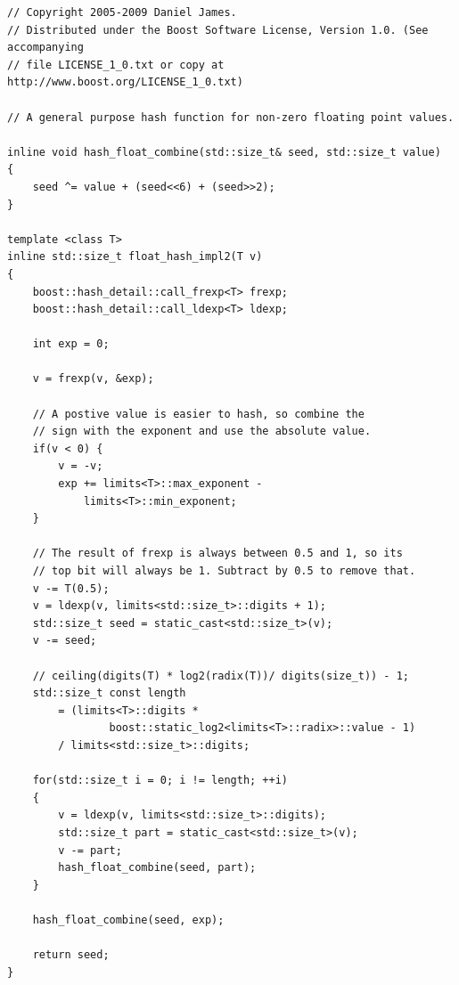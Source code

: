\begin{lstlisting}[label=lst:hash-float-function, caption=Code to Hash Single 32-bit Floating Point Value (Source code from file \texttt{boost/functional/hash/detail/hash\_float\_generic.hpp} in Boost Library 1.42.0)]
// Copyright 2005-2009 Daniel James.
// Distributed under the Boost Software License, Version 1.0. (See accompanying
// file LICENSE_1_0.txt or copy at http://www.boost.org/LICENSE_1_0.txt)

// A general purpose hash function for non-zero floating point values.

inline void hash_float_combine(std::size_t& seed, std::size_t value)
{
    seed ^= value + (seed<<6) + (seed>>2);
}

template <class T>
inline std::size_t float_hash_impl2(T v)
{
    boost::hash_detail::call_frexp<T> frexp;
    boost::hash_detail::call_ldexp<T> ldexp;

    int exp = 0;

    v = frexp(v, &exp);

    // A postive value is easier to hash, so combine the
    // sign with the exponent and use the absolute value.
    if(v < 0) {
        v = -v;
        exp += limits<T>::max_exponent -
            limits<T>::min_exponent;
    }

    // The result of frexp is always between 0.5 and 1, so its
    // top bit will always be 1. Subtract by 0.5 to remove that.
    v -= T(0.5);
    v = ldexp(v, limits<std::size_t>::digits + 1);
    std::size_t seed = static_cast<std::size_t>(v);
    v -= seed;

    // ceiling(digits(T) * log2(radix(T))/ digits(size_t)) - 1;
    std::size_t const length
        = (limits<T>::digits *
                boost::static_log2<limits<T>::radix>::value - 1)
        / limits<std::size_t>::digits;

    for(std::size_t i = 0; i != length; ++i)
    {
        v = ldexp(v, limits<std::size_t>::digits);
        std::size_t part = static_cast<std::size_t>(v);
        v -= part;
        hash_float_combine(seed, part);
    }

    hash_float_combine(seed, exp);

    return seed;
}
\end{lstlisting}